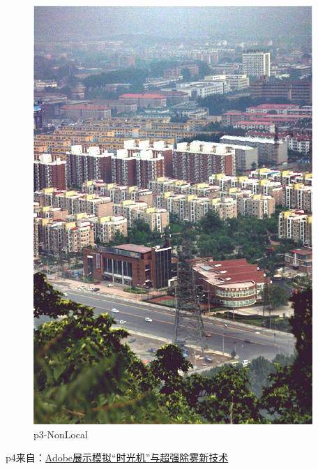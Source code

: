 \documentclass[12pt]{article}
\begin{document}
\begin{figure}[!h]
\begin{minipage}[t]{0.24\linewidth}
        \includegraphics[width=0.9\linewidth]{sample_pictures/after_p3_NonLocal.jpg}
        \caption*{p3-NonLocal}
    \end{minipage}
 \end{figure}\par
 \newpage
 p4来自：\href{http://bbs.01ny.cn/forum.php?mod=viewthread&tid=3567038}{Adobe展示模拟“时光机”与超强除雾新技术}
\end{document}
